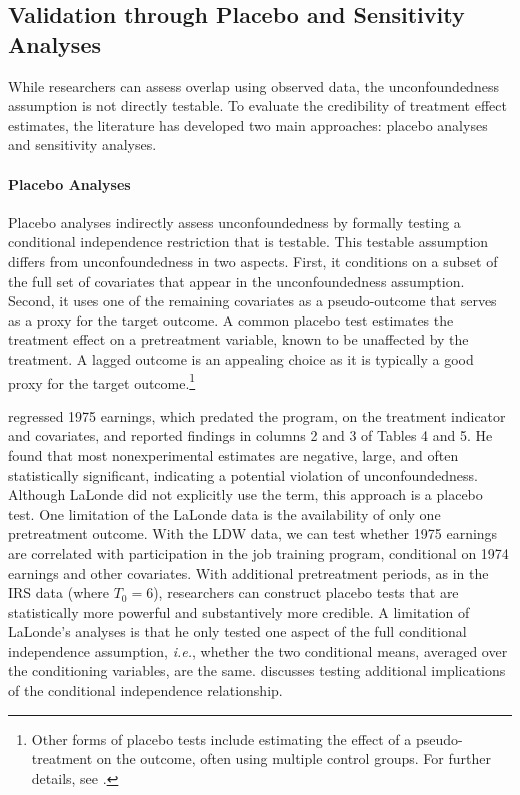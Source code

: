 \documentclass[letterpaper,12pt,leqno]{article}
\begin{document}
\subsection{Validation through Placebo and Sensitivity Analyses}\label{placebo}

While researchers can assess overlap using observed data, the unconfoundedness assumption is not directly testable. To evaluate the credibility of treatment effect estimates, the literature has developed two main approaches: placebo analyses and sensitivity analyses. 

\paragraph{Placebo Analyses} 

Placebo analyses indirectly assess unconfoundedness by formally testing a conditional independence restriction that is testable. This testable assumption differs from unconfoundedness in two aspects. First, it conditions on a subset of the full set of covariates that appear in the unconfoundedness assumption. Second, it uses one of the remaining covariates as a pseudo-outcome that serves as a proxy for the target outcome. A common placebo test estimates the treatment effect on a pretreatment variable, known to be unaffected by the treatment. A lagged outcome is an appealing choice as it is typically a good proxy for the target outcome.\footnote{Other forms of placebo tests include estimating the effect of a pseudo-treatment on the outcome, often using multiple control groups. For further details, see \citet{rosenbaum1987role, imbens2015causal, imbens2015}.}

\citet{LaLonde} regressed 1975 earnings, which predated the program, on the treatment indicator and covariates, and reported findings in columns 2 and 3 of Tables 4 and 5. He found that most nonexperimental estimates are negative, large, and often statistically significant, indicating a potential violation of unconfoundedness. Although LaLonde did not explicitly use the term, this approach is a placebo test. One limitation of the LaLonde data is the availability of only one pretreatment outcome. With the LDW data, we can test whether 1975 earnings are correlated with participation in the job training program, conditional on 1974 earnings and other covariates. With additional pretreatment periods, as in the IRS data (where $T_{0} = 6$), researchers can construct placebo tests that are statistically more powerful and substantively more credible. A limitation of LaLonde's analyses is that he only tested one aspect of the full conditional independence assumption, {\it i.e.}, whether the two conditional means, averaged over the conditioning variables, are the same. \citet{imbens2015} discusses testing additional implications of the conditional independence relationship.
\end{document}
